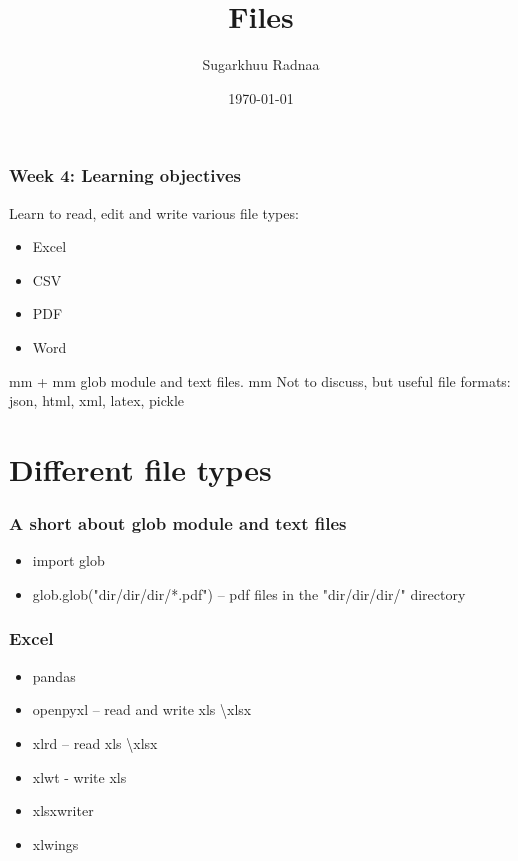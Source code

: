 \documentclass{beamer}
\title[Introduction to Python]{Files}
\author{Sugarkhuu Radnaa}
\institute[]
{
Py4Econ in Ulaanbaatar \\ 
\medskip
\textit{py4econ@gmail.com} 
}
\date{\today}  %
\begin{document}
\begin{frame}
\titlepage %
\end{frame}

\begin{frame}
    \frametitle{Week 4: Learning objectives}
Learn to read, edit and write various file types: 
    \begin{itemize}
        \item Excel
        \item CSV
        \item PDF 
        \item Word
    \end{itemize}
 mm
+
 mm
glob module and text files.
 mm
Not to discuss, but useful file formats: json, html, xml, latex, pickle

\end{frame}

\section{Different file types} 

\begin{frame}
    \frametitle{A short about glob module and text files}
            \begin{itemize}
                \item import glob
                \item glob.glob("dir/dir/dir/*.pdf") – pdf files in the "dir/dir/dir/" directory
                
            \end{itemize}
\end{frame}

\begin{frame}
    \frametitle{Excel}
            \begin{itemize}
                \item pandas
                \item openpyxl – read and write xls \textbackslash xlsx
                \item xlrd – read xls \textbackslash xlsx
                \item xlwt - write xls
                \item xlsxwriter
                \item xlwings
            \end{itemize}
\end{frame}
\end{document}
